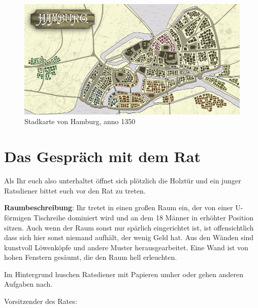 \begin{figure}[t]
\begin{center}
	\includegraphics[scale=0.7]{./01-img/Karte.png}
	\caption{Stadkarte von Hamburg, anno 1350}
    	\label{fig:Karte}
\end{center}
\end{figure}


\section{Das Gespräch mit dem Rat}
\label{sec:ratsgespräch}

Als Ihr euch also unterhaltet öffnet sich plötzlich die Holztür und ein junger
Ratsdiener bittet euch vor den Rat zu treten.

\textbf{Raumbeschreibung}: Ihr tretet in einen großen Raum ein, der von einer U-förmigen Tischreihe dominiert wird und an dem 18 Männer in erhöhter Position sitzen. Auch wenn der Raum sonst nur spärlich eingerichtet ist, ist offensichtlich dass sich hier sonst niemand aufhält, der wenig Geld hat. Aus den Wänden sind kunstvoll Löwenköpfe und andere Muster herausgearbeitet. Eine Wand ist von hohen Fenstern gesäumt, die den Raum hell erleuchten.

Im Hintergrund huschen Ratsdiener mit Papieren umher oder gehen anderen Aufgaben nach.


Vorsitzender des Rates:


